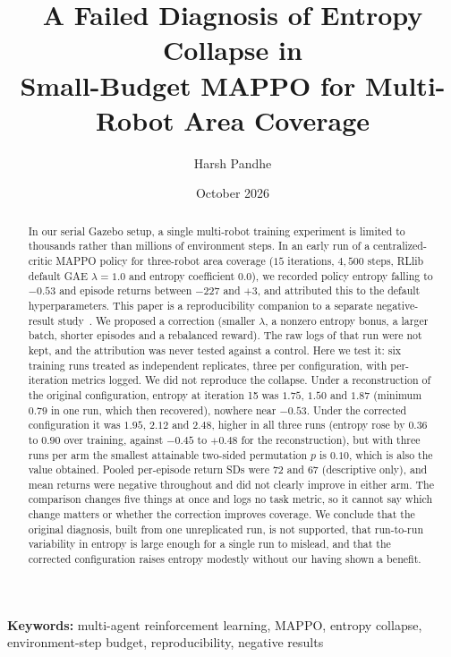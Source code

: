 \documentclass[12pt]{article}
\title{A Failed Diagnosis of Entropy Collapse in\\
Small-Budget MAPPO for Multi-Robot Area Coverage}
\author[1]{Harsh Pandhe}
\affil[1]{Independent Research \\ \texttt{harshpandhehome@gmail.com}}
\date{October 2026}
\begin{document}
\maketitle

\begin{abstract}
\noindent
In our serial Gazebo setup, a single multi-robot training experiment is
limited to thousands rather than millions of environment steps. In an early run of a centralized-critic MAPPO policy for
three-robot area coverage ($15$ iterations, $4{,}500$ steps, RLlib default
GAE $\lambda=1.0$ and entropy coefficient $0.0$), we recorded policy entropy
falling to $-0.53$ and episode returns between $-227$ and $+3$, and
attributed this to the default hyperparameters. This paper is a reproducibility companion to a separate negative-result study~\cite{pandhe2026mappo}. We proposed a correction
(smaller $\lambda$, a nonzero entropy bonus, a larger batch, shorter episodes
and a rebalanced reward). The raw logs of that run were not kept, and the
attribution was never tested against a control. Here we test it: six
training runs treated as independent replicates, three per configuration, with per-iteration
metrics logged. We did not reproduce the collapse. Under a reconstruction of the original
configuration, entropy at iteration 15 was $1.75$, $1.50$ and $1.87$ (minimum
$0.79$ in one run, which then recovered), nowhere near $-0.53$. Under the
corrected configuration it was $1.95$, $2.12$ and $2.48$, higher in all
three runs (entropy rose by $0.36$ to $0.90$ over training, against
$-0.45$ to $+0.48$ for the reconstruction), but with three runs per arm the
smallest attainable two-sided permutation $p$ is $0.10$, which is also the
value obtained. Pooled per-episode return SDs were $72$ and $67$ (descriptive only), and mean returns were negative throughout and did not clearly improve in either arm. The
comparison changes five things at once and logs no task metric, so it
cannot say which change matters or whether the correction improves
coverage. We conclude that the original diagnosis, built from one
unreplicated run, is not supported, that run-to-run variability in entropy
is large enough for a single run to mislead, and that the corrected
configuration raises entropy modestly without our having shown a benefit.
\end{abstract}

\noindent\textbf{Keywords:} multi-agent reinforcement learning, MAPPO,
entropy collapse, environment-step budget, reproducibility, negative results
\end{document}
